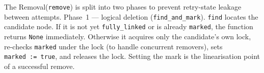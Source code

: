 \documentclass[11pt,a4paper]{article}
\begin{document}


\vspace{1em}
The Removal(\texttt{remove}) is split into two phases to prevent retry-state leakage between
attempts. Phase~1 — logical deletion (\texttt{find\_and\_mark}).
\texttt{find} locates the candidate node.  If it is not yet \texttt{fully\_linked}
or is already \texttt{marked}, the function returns \texttt{None} immediately.
Otherwise it acquires only the candidate's own lock, re-checks
\texttt{marked} under the lock (to handle concurrent removers), sets
\texttt{marked~:=~true}, and releases the lock.  Setting the mark is the
linearisation point of a successful remove.
\end{document}
